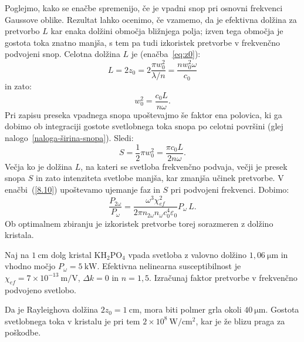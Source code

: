 Poglejmo, kako se enačbe spremenijo, če je vpadni snop pri osnovni 
frekvenci Gaussove oblike. 
Rezultat lahko ocenimo, če vzamemo, da je
efektivna dolžina za pretvorbo $L$ kar enaka dolžini območja bližnjega polja; izven tega območja je 
gostota toka znatno manjša, s tem pa tudi izkoristek pretvorbe v 
frekvenčno podvojeni snop.
Celotna  dolžina $L$ je (enačba~\ref{eq:z0}):
\begin{equation}
L=2z_{0}=2\frac{\pi w_{0}^{2}}{\lambda/n} = \frac{n w_0^2 \omega}{c_0}
\end{equation}
in zato:
\begin{equation}
w_{0}^{2} = \frac{c_0 L}{n \omega}.
\label{SHGG}
\end{equation}
Pri zapisu preseka vpadnega snopa upoštevajmo še faktor ena polovica, ki ga 
dobimo ob integraciji gostote svetlobnega toka
snopa po celotni površini (glej nalogo~\ref{naloga-širina-snopa}). Sledi:
\begin{equation}
S=\frac{1}{2}\pi w_{0}^{2} = \frac{\pi c_0 L}{2 n \omega}.
\end{equation}
Večja ko je dolžina $L$, na kateri se svetloba frekvenčno podvaja, 
večji je presek snopa $S$ in zato intenziteta svetlobe manjša, kar zmanjša
učinek pretvorbe.
V enačbi~(\ref{8.10}) upoštevamo ujemanje faz in $S$ pri podvojeni frekvenci. Dobimo:
\begin{equation}
\frac{P_{2\omega}}{P_{\omega}}=
\frac{\omega^3 \chi_{ef}^2}{2\pi n_{2\omega} n_\omega c_0^4 \varepsilon_0} P_\omega\,L.
\label{8.17}
\end{equation}
Ob optimalnem zbiranju je izkoristek pretvorbe torej sorazmeren z dolžino kristala.

\begin{naloga}
Naj na $1~\si{\centi\metre}$ dolg kristal KH$_{2}$PO$_{4}$ vpada svetloba
z valovno dolžino $1,06~\si{\micro\metre}$ in vhodno močjo $P_\omega = 5~\si{\kilo\watt}$.
Efektivna nelinearna susceptibilnost je $\chi_{ef}=7\times 10^{-13}~\si{\metre/\volt}$, 
$\Delta k=0$ in $n=1,5$. Izračunaj
faktor pretvorbe v frekvenčno podvojeno svetlobo.

Da je Rayleighova dolžina $2z_{0}=1~\si{\centi\metre}$, mora biti polmer
grla okoli $40~\si{\micro\metre}$. Gostota svetlobnega toka v kristalu je pri
tem $2\times 10^{8}~\si{\watt/\centi\metre^{2}}$, kar je že blizu praga za poškodbe. 
\end{naloga}

